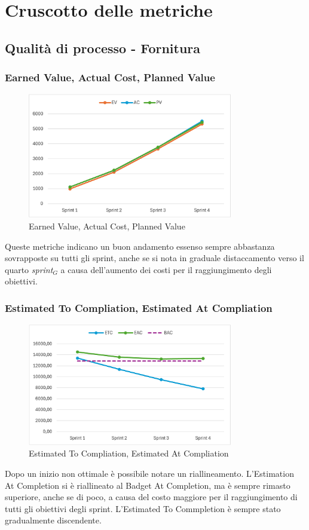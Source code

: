 \section{Cruscotto delle metriche}
\subsection{Qualità di processo - Fornitura}
\subsubsection{Earned Value, Actual Cost, Planned Value}
\begin{figure}[H]
    \centering
    \includegraphics[width=0.8\textwidth]{./images/EV-AC-PV.png}
    \caption{Earned Value, Actual Cost, Planned Value}
\end{figure}
Queste metriche indicano un buon andamento essenso sempre abbastanza sovrapposte su tutti gli sprint, anche se si nota in graduale distaccamento verso il quarto \textit{sprint}$_G$ a causa dell'aumento dei costi per il raggiungimento degli obiettivi.

\subsubsection{Estimated To Compliation, Estimated At Compliation}
\begin{figure}[H]
    \centering
    \includegraphics[width=0.8\textwidth]{./images/ETC-EAC.png}
    \caption{Estimated To Compliation, Estimated At Compliation}
\end{figure}
Dopo un inizio non ottimale è possibile notare un riallineamento. L'Estimation At Completion si è riallineato al Badget At Completion, ma è sempre rimasto superiore, anche se di poco, a causa del costo maggiore per il raggiungimento di tutti gli obiettivi degli sprint. L'Estimated To Commpletion è sempre stato gradualmente discendente.
